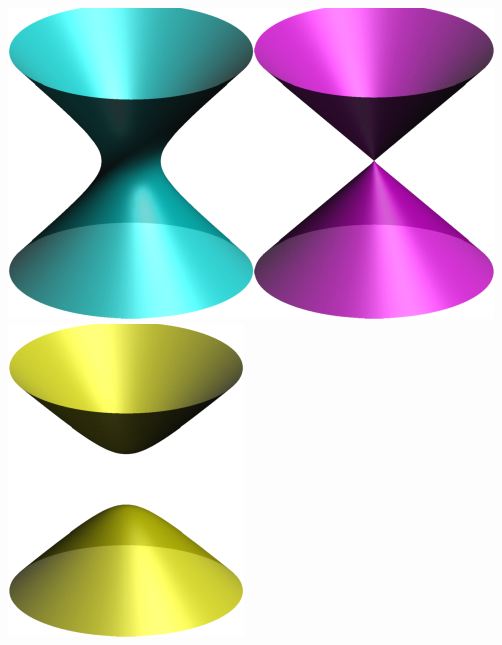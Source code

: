 \begin{examples}{}{}
\begin{enumerate}
\begin{center}
	\includegraphics{surfaces-hyper1}\qquad\includegraphics{surfaces-cone}\qquad 	\includegraphics{surfaces-hyper2}
	\end{center}
\end{enumerate}
\end{examples}

